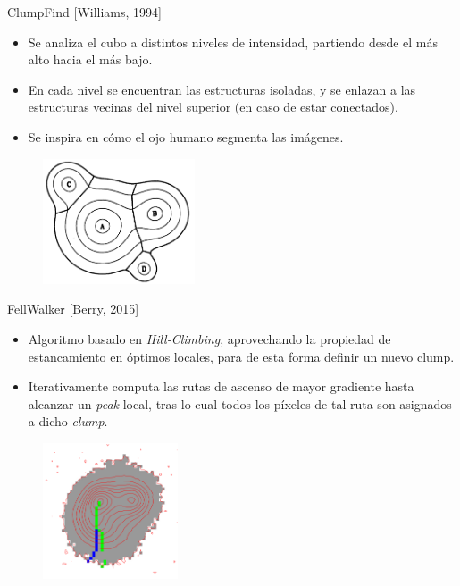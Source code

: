 \documentclass{beamer}
\begin{document}
\begin{frame}{ClumpFind [Williams, 1994]}
\begin{itemize}
  \item Se analiza el cubo a distintos niveles de intensidad, partiendo desde el más alto hacia el más bajo.
  \item En cada nivel se encuentran las estructuras isoladas, y se enlazan a las estructuras vecinas del nivel superior (en caso de estar conectados).
  \item Se inspira en cómo el ojo humano segmenta las imágenes.  
\end{itemize}
\begin{figure}[htpb!]
\centering
\includegraphics[width=4.5cm]{cf}
\end{figure}
\end{frame}

\begin{frame}{FellWalker [Berry, 2015]}
\begin{itemize}
  \item Algoritmo basado en \textit{Hill-Climbing}, aprovechando la propiedad de estancamiento en óptimos locales, para de esta forma definir un nuevo clump.
  \item Iterativamente computa las rutas de ascenso de mayor gradiente hasta alcanzar un \textit{peak} local, tras lo cual todos los píxeles de tal ruta son asignados a dicho \textit{clump}.
\end{itemize}
\begin{figure}[htpb!]
\centering
\includegraphics[width=4cm]{fw}
\end{figure}
\end{frame}
\end{document}
